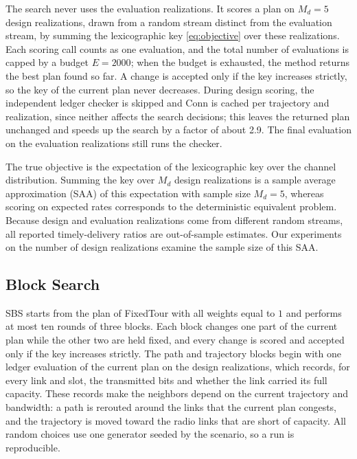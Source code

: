 \label{sec:scoring}
The search never uses the evaluation realizations. It scores a plan on $M_d=5$ design realizations, drawn from a random stream distinct from the evaluation stream, by summing the lexicographic key \eqref{eq:objective} over these realizations. Each scoring call counts as one evaluation, and the total number of evaluations is capped by a budget $E=2000$; when the budget is exhausted, the method returns the best plan found so far. A change is accepted only if the key increases strictly, so the key of the current plan never decreases. During design scoring, the independent ledger checker is skipped and $\mathrm{Conn}$ is cached per trajectory and realization, since neither affects the search decisions; this leaves the returned plan unchanged and speeds up the search by a factor of about \num{2.9}. The final evaluation on the evaluation realizations still runs the checker.

The true objective is the expectation of the lexicographic key over the channel distribution. Summing the key over $M_d$ design realizations is a sample average approximation (SAA) of this expectation with sample size $M_d=5$, whereas scoring on expected rates corresponds to the deterministic equivalent problem. Because design and evaluation realizations come from different random streams, all reported timely-delivery ratios are out-of-sample estimates. Our experiments on the number of design realizations examine the sample size of this SAA.

\subsection{Block Search}
\label{sec:b2}
SBS starts from the plan of FixedTour with all weights equal to $1$ and performs at most ten rounds of three blocks. Each block changes one part of the current plan while the other two are held fixed, and every change is scored and accepted only if the key increases strictly. The path and trajectory blocks begin with one ledger evaluation of the current plan on the design realizations, which records, for every link and slot, the transmitted bits and whether the link carried its full capacity. These records make the neighbors depend on the current trajectory and bandwidth: a path is rerouted around the links that the current plan congests, and the trajectory is moved toward the radio links that are short of capacity. All random choices use one generator seeded by the scenario, so a run is reproducible.

